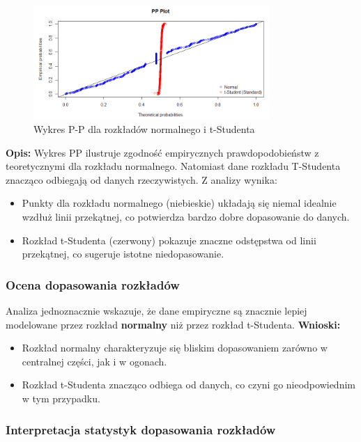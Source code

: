 \documentclass[a4paper,11pt]{article}
\begin{document}
\begin{figure}[H]
    \centering
    \includegraphics[width=0.8\textwidth]{./Wojtek/wykres-pp.png}
    \caption{Wykres P-P dla rozkładów normalnego i t-Studenta}
    \label{fig:pp_plot}
\end{figure}

\textbf{Opis:} Wykres PP ilustruje zgodność empirycznych prawdopodobieństw z teoretycznymi dla rozkładu normalnego. Natomiast dane rozkładu T-Studenta znacząco odbiegają od danych rzeczywistych.  
Z analizy wynika:
\begin{itemize}
    \item Punkty dla rozkładu normalnego (niebieskie) układają się niemal idealnie wzdłuż linii przekątnej, co potwierdza bardzo dobre dopasowanie do danych.
    \item Rozkład t-Studenta (czerwony) pokazuje znaczne odstępstwa od linii przekątnej, co sugeruje istotne niedopasowanie.
\end{itemize}

\subsubsection{Ocena dopasowania rozkładów}

Analiza jednoznacznie wskazuje, że dane empiryczne są znacznie lepiej modelowane przez rozkład \textbf{normalny} niż przez rozkład t-Studenta.  
\textbf{Wnioski:}
\begin{itemize}
    \item Rozkład normalny charakteryzuje się bliskim dopasowaniem zarówno w centralnej części, jak i w ogonach.
    \item Rozkład t-Studenta znacząco odbiega od danych, co czyni go nieodpowiednim w tym przypadku.
\end{itemize}

\newpage\subsubsection*{Interpretacja statystyk dopasowania rozkładów}
\end{document}
